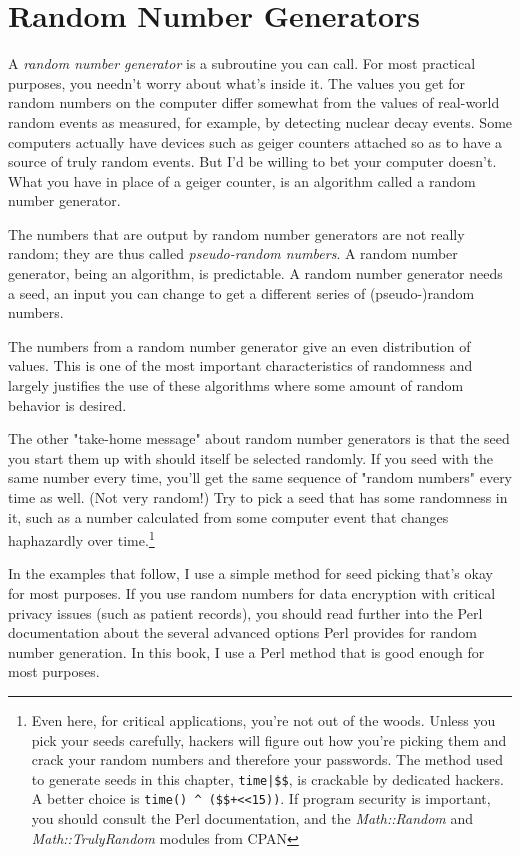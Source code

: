 \section{Random Number Generators}
A \textit{random number generator} is a subroutine you can call. For most practical purposes, you needn't worry about what's inside it. The values you get for random numbers on the computer differ somewhat from the values of real-world random events as measured, for example, by detecting nuclear decay events. Some computers actually have devices such as geiger counters attached so as to have a source of truly random events. But I'd be willing to bet your computer doesn't. What you have in place of a geiger counter, is an algorithm called a random number generator.

The numbers that are output by random number generators are not really random; they are thus called \textit{pseudo-random numbers}. A random number generator, being an algorithm, is predictable. A random number generator needs a seed, an input you can change to get a different series of (pseudo-)random numbers.

The numbers from a random number generator give an even distribution of values. This is one of the most important characteristics of randomness and largely justifies the use of these algorithms where some amount of random behavior is desired.

The other "take-home message" about random number generators is that the seed you start them up with should itself be selected randomly. If you seed with the same number every time, you'll get the same sequence of "random numbers" every time as well. (Not very random!) Try to pick a seed that has some randomness in it, such as a number calculated from some computer event that changes haphazardly over time.\footnote{Even here, for critical applications, you're not out of the woods. Unless you pick your seeds carefully, hackers will figure out how you're picking them and crack your random numbers and therefore your passwords. The method used to generate seeds in this chapter, \verb=time|$$=, is crackable by dedicated hackers. A better choice is \verb=time() ^ ($$+<<15))=. If program security is important, you should consult the Perl documentation, and the \textit{Math::Random} and \textit{Math::TrulyRandom} modules from CPAN}

In the examples that follow, I use a simple method for seed picking that's okay for most purposes. If you use random numbers for data encryption with critical privacy issues (such as patient records), you should read further into the Perl documentation about the several advanced options Perl provides for random number generation. In this book, I use a Perl method that is good enough for most purposes.

